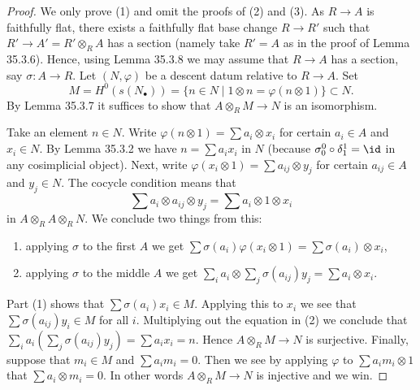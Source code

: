 \begin{proof}
We only prove (1) and omit the proofs of (2) and (3). As $R\to A$ is faithfully flat, there exists a faithfully flat base change $R\to R'$ such that $R'\to A'=R'\otimes_R A$ has a section (namely take $R'=A$ as in the proof of Lemma 35.3.6). Hence, using Lemma 35.3.8 we may assume that $R\to A$ has a section, say $\sigma:A\to R$. Let $(N,\varphi)$ be a descent datum relative to $R\to A$. Set
\[
M=H^0(s(N_\bullet))=\{n\in N\mid1\otimes n=\varphi(n\otimes1)\}\subset N.
\]
By Lemma 35.3.7 it suffices to show that $A\otimes_R M\to N$ is an isomorphism.

Take an element $n\in N$. Write $\varphi(n\otimes1)=\sum a_i\otimes x_i$ for certain $a_i\in A$ and $x_i\in N$. By Lemma 35.3.2 we have $n=\sum a_i x_i$ in $N$ (because $\sigma^0_0\circ\delta^1_1=\id$ in any cosimplicial object). Next, write $\varphi(x_i\otimes1)=\sum a_{ij}\otimes y_j$ for certain $a_{ij}\in A$ and $y_j\in N$. The cocycle condition means that
\[
\sum a_i\otimes a_{ij}\otimes y_j=\sum a_i\otimes1\otimes x_i
\]
in $A\otimes_R A\otimes_R N$. We conclude two things from this:
\begin{enumerate}
\item applying $\sigma$ to the first $A$ we get $\sum\sigma(a_i)\varphi(x_i\otimes1)=\sum\sigma(a_i)\otimes x_i$,
\item applying $\sigma$ to the middle $A$ we get $\sum_i a_i\otimes\sum_j\sigma(a_{ij})y_j=\sum a_i\otimes x_i$.
\end{enumerate}
Part (1) shows that $\sum\sigma(a_i)x_i\in M$. Applying this to $x_i$ we see that $\sum\sigma(a_{ij})y_i\in M$ for all $i$. Multiplying out the equation in (2) we conclude that $\sum_i a_i(\sum_j\sigma(a_{ij})y_j)=\sum a_i x_i=n$. Hence $A\otimes_R M\to N$ is surjective. Finally, suppose that $m_i\in M$ and $\sum a_i m_i=0$. Then we see by applying $\varphi$ to $\sum a_i m_i\otimes1$ that $\sum a_i\otimes m_i=0$. In other words $A\otimes_R M\to N$ is injective and we win.
\end{proof}
